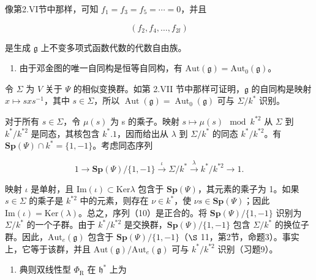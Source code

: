 像第2.VI节中那样，可知 \(f_{1}=f_{3}=f_{5}=\cdots=0\)，并且

\[
(f _ {2}, f _ {4}, \dots , f _ {2 l})
\]

是生成 \(\mathfrak{g}\) 上不变多项式函数代数的代数自由族。

\begin{enumerate}
\def\labelenumi{(\Roman{enumi})}
\setcounter{enumi}{6}
\tightlist
\item
由于邓金图的唯一自同构是恒等自同构，有 \(\mathrm{Aut}(\mathfrak{g}) = \mathrm{Aut}_0(\mathfrak{g})\)。
\end{enumerate}

令 \(\Sigma\) 为 \(V\) 关于 \(\Psi\) 的相似变换群。如第 2.VII 节中那样可证明，\(\mathfrak{g}\) 的自同构是映射 \(x \mapsto sxs^{-1}\)，其中 \(s \in \Sigma\)，所以 \(\operatorname{Aut}(\mathfrak{g}) = \operatorname{Aut}_0(\mathfrak{g})\) 可与 \(\Sigma / k^*\) 识别。

对于所有 \(s \in \Sigma\)，令 \(\mu(s)\) 为 s 的乘子。映射 \(s \mapsto \mu(s) \mod k^{*2}\) 从 \(\Sigma\) 到 \(k^{*}/k^{*2}\) 是同态，其核包含 \(k^{*}.1\)，因而给出从 \(\lambda\) 到 \(\Sigma/k^{*}\) 的同态 \(k^{*}/k^{*2}\)。有 \(\mathbf{Sp}(\varPsi) \cap k^{*} = \{1, -1\}\)。考虑同态序列

\[
1 \longrightarrow \mathbf {S p} (\Psi) / \{1, - 1 \} \stackrel {{\iota}} {{\longrightarrow}} \Sigma / k ^ {*} \stackrel {{\lambda}} {{\longrightarrow}} k ^ {*} / k ^ {* 2} \longrightarrow 1.\tag{10}
\]

映射 \(\iota\) 是单射，且 \(\mathrm{Im}(\iota) \subset \mathrm{Ker}\lambda\) 包含于 \(\mathbf{Sp}(\varPsi)\)，其元素的乘子为 1。如果 \(s \in \varSigma\) 的乘子是 \(k^{*2}\) 中的元素，则存在 \(\nu \in k^*\)，使 \(\nu s \in \mathbf{Sp}(\varPsi)\)；因此 \(\mathrm{Im}(\iota) = \mathrm{Ker}(\lambda)\)。总之，序列（10）是正合的。将 \(\mathbf{Sp}(\varPsi)/\{1, -1\}\) 识别为 \(\varSigma/k^*\) 的一个子群。由于 \(k^*/k^{*2}\) 是交换群，\(\mathbf{Sp}(\varPsi)/\{1, -1\}\) 包含 \(\varSigma/k^*\) 的换位子群。因此，\(\mathrm{Aut}_e(\mathfrak{g})\) 包含于 \(\mathbf{Sp}(\varPsi)/\{1, -1\}\)（\(\S\) 11，第2节，命题3）。事实上，它等于该群，并且 \(\mathrm{Aut}(\mathfrak{g})/\mathrm{Aut}_e(\mathfrak{g})\) 可与 \(k^*/k^{*2}\) 识别（习题9）。

\begin{enumerate}
\def\labelenumi{(\Roman{enumi})}
\setcounter{enumi}{7}
\tightlist
\item
典则双线性型 \(\Phi_{\mathrm{R}}\) 在 \(\mathfrak{h}^*\) 上为
\end{enumerate}

